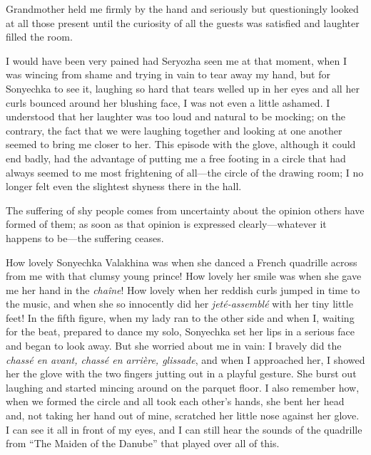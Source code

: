 Grandmother held me firmly by the hand and seriously but questioningly looked at all those present until the curiosity of all the guests was satisfied and laughter filled the room. 

I would have been very pained had Seryozha seen me at that moment, when I was wincing from shame and trying in vain to tear away my hand, but for Sonyechka to see it, laughing so hard that tears welled up in her eyes and all her curls bounced around her blushing face, I was not even a little ashamed. I understood that her laughter was too loud and natural to be mocking; on the contrary, the fact that we were laughing together and looking at one another seemed to bring me closer to her. This episode with the glove, although it could end badly, had the advantage of putting me a free footing in a circle that had always seemed to me most frightening of all---the circle of the drawing room; I no longer felt even the slightest shyness there in the hall.

The suffering of shy people comes from uncertainty about the opinion others have formed of them; as soon as that opinion is expressed clearly---whatever it happens to be---the suffering ceases.

How lovely Sonyechka Valakhina was when she danced a French quadrille across from me with that clumsy young prince! How lovely her smile was when she gave me her hand in the \textit{cha\^ine}! How lovely when her reddish curls jumped in time to the music, and when she so innocently did her \textit{jet\'e-assembl\'e} with her tiny little feet! In the fifth figure, when my lady ran to the other side and when I, waiting for the beat, prepared to dance my solo, Sonyechka set her lips in a serious face and began to look away. But she worried about me in vain: I bravely did the \textit{chass\'e en avant, chass\'e en arri\`ere, glissade}, and when I approached her, I showed her the glove with the two fingers jutting out in a playful gesture. She burst out laughing and started mincing around on the parquet floor. I also remember how, when we formed the circle and all took each other's hands, she bent her head and, not taking her hand out of mine, scratched her little nose against her glove. I can see it all in front of my eyes, and I can still hear the sounds of the quadrille from ``The Maiden of the Danube'' that played over all of this.


